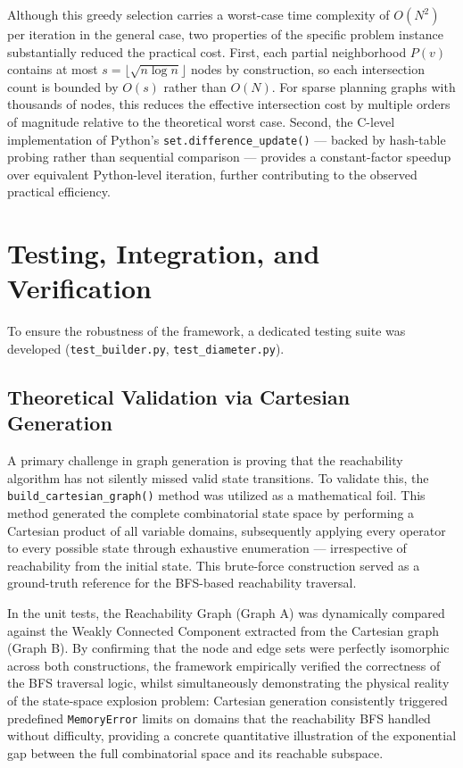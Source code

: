 Although this greedy selection carries a worst-case time complexity of $O(N^2)$ per iteration in the general case, two properties of the specific problem instance substantially reduced the practical cost. First, each partial neighborhood $P(v)$ contains at most $s = \lfloor\sqrt{n \log n}\rfloor$ nodes by construction, so each intersection count is bounded by $O(s)$ rather than $O(N)$. For sparse planning graphs with thousands of nodes, this reduces the effective intersection cost by multiple orders of magnitude relative to the theoretical worst case. Second, the C-level implementation of Python's \texttt{set.difference\_update()} — backed by hash-table probing rather than sequential comparison — provides a constant-factor speedup over equivalent Python-level iteration, further contributing to the observed practical efficiency.

\section{Testing, Integration, and Verification}
To ensure the robustness of the framework, a dedicated testing suite was developed (\texttt{test\_builder.py}, \texttt{test\_diameter.py}).

\subsection{Theoretical Validation via Cartesian Generation}
A primary challenge in graph generation is proving that the reachability algorithm has not silently missed valid state transitions. To validate this, the \texttt{build\_cartesian\_graph()} method was utilized as a mathematical foil. This method generated the complete combinatorial state space by performing a Cartesian product of all variable domains, subsequently applying every operator to every possible state through exhaustive enumeration — irrespective of reachability from the initial state. This brute-force construction served as a ground-truth reference for the BFS-based reachability traversal.
 
In the unit tests, the Reachability Graph (Graph A) was dynamically compared against the Weakly Connected Component extracted from the Cartesian graph (Graph B). By confirming that the node and edge sets were perfectly isomorphic across both constructions, the framework empirically verified the correctness of the BFS traversal logic, whilst simultaneously demonstrating the physical reality of the state-space explosion problem: Cartesian generation consistently triggered predefined \texttt{MemoryError} limits on domains that the reachability BFS handled without difficulty, providing a concrete quantitative illustration of the exponential gap between the full combinatorial space and its reachable subspace.

